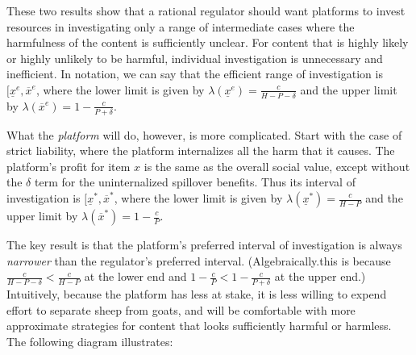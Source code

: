 These two results show that a rational regulator should want platforms to invest resources in investigating only a range of intermediate cases where the harmfulness of the content is sufficiently unclear. For content that is highly likely or highly unlikely to be harmful, individual investigation is unnecessary and inefficient. In notation, we can say that the efficient range of investigation is $[\underline{x}^e, \overline{x}^e$, where the lower limit  is given by $\lambda(\underline{x}^e) = \frac{c}{H - P - \delta} $ and the upper limit by $\lambda(\overline{x}^e) = 1 - \frac{c}{P + \delta}$.

What the \emph{platform} will do, however, is more complicated. Start with the case of strict liability, where the platform internalizes all the harm that it causes. The platform's profit for item $x$ is the same as the overall social value, except without the $\delta$ term for the uninternalized spillover benefits. Thus its interval of investigation is $[\underline{x}^*, \overline{x}^*$, where the lower limit  is given by $\lambda(\underline{x}^*) = \frac{c}{H - P} $ and the upper limit by $\lambda(\overline{x}^*) = 1 - \frac{c}{P}$.

The key result is that the platform's preferred interval of investigation is always \emph{narrower} than the regulator's preferred interval. (Algebraically.this is because  $\frac{c}{H - P - \delta} < \frac{c}{H - P}$ at the lower end and $1 - \frac{c}{P} < 1 - \frac{c}{P + \delta}$ at the upper end.) Intuitively, because the platform has less at stake, it is less willing to expend effort to separate sheep from goats, and will be comfortable with more approximate strategies for content that looks sufficiently harmful or harmless. The following diagram illustrates:

